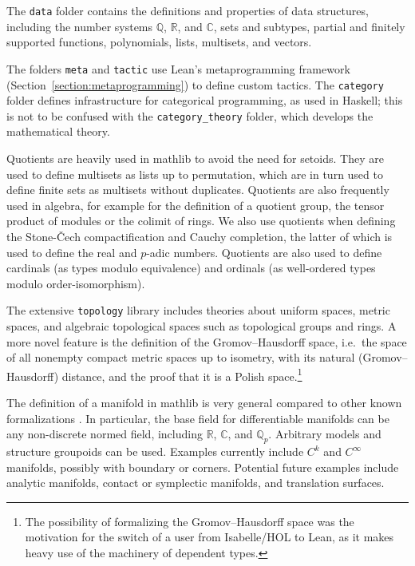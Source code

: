 \documentclass[sigplan]{acmart}\settopmatter{}
\newcommand{\mathlib}{\textsf{mathlib}\xspace}
\begin{document}
The \texttt{data} folder contains the definitions and properties of data structures,%
including the number systems $\mathbb{Q}$, $\mathbb{R}$, and $\mathbb{C}$,
sets and subtypes,
partial and finitely supported functions,
polynomials, lists, multisets, and vectors.

The folders \texttt{meta} and \texttt{tactic} use Lean's metaprogramming framework (Section~\ref{section:metaprogramming}) to define custom tactics. The \texttt{category} folder defines infrastructure for categorical programming, as used in Haskell; this is not to be confused with the \texttt{category\_theory} folder, which develops the mathematical theory.

Quotients are heavily used in \mathlib to avoid the need for setoids.
They are used to define multisets as lists up to permutation, which are in turn used to define finite sets as multisets without duplicates.
Quotients are also frequently used in algebra, for example for the definition of a quotient group, the tensor product of modules or the colimit of rings.
We also use quotients when defining the Stone-\v Cech compactification and Cauchy completion, the latter of which is used to define the real and $p$-adic numbers.
Quotients are also used to define cardinals (as types modulo equivalence) and ordinals (as well-ordered types modulo order-isomorphism).


The extensive \texttt{topology} library includes theories about uniform spaces, metric spaces,
and algebraic topological spaces such as topological groups and rings.
A more novel feature is the definition of the Gromov--Hausdorff space,
i.e.\ the space of all nonempty compact metric spaces up to isometry,
with its natural (Gromov--Hausdorff) distance,
and the proof that it is a Polish space.\footnote{
The possibility of formalizing the Gromov--Hausdorff space
was the motivation for the switch of a user from Isabelle/HOL to Lean,
as it makes heavy use of the machinery of dependent types.}

The definition of a manifold in mathlib is very general compared to other known formalizations \cite{DBLP:conf/cpp/ImmlerZ19,Pak16}.
In particular,
the base field for differentiable manifolds can be any non-discrete normed field,
including $\mathbb{R}$, $\mathbb{C}$, and $\mathbb{Q}_p$.
Arbitrary models and structure groupoids can be used.
Examples currently include $C^k$ and $C^\infty$ manifolds,
possibly with boundary or corners.
Potential future examples include analytic manifolds,
contact or symplectic manifolds, and translation surfaces.
\end{document}
